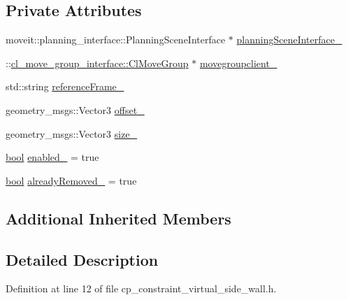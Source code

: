 \subsection*{Private Attributes}
\begin{DoxyCompactItemize}
\item 
moveit\+::planning\+\_\+interface\+::\+Planning\+Scene\+Interface $\ast$ \hyperlink{classsm__fetch__screw__loop__1_1_1cl__move__group__interface_1_1CpConstraintVirtualSideWall_a36d055e567438938c2355ad5ee081498}{planning\+Scene\+Interface\+\_\+}
\item 
\+::\hyperlink{classcl__move__group__interface_1_1ClMoveGroup}{cl\+\_\+move\+\_\+group\+\_\+interface\+::\+Cl\+Move\+Group} $\ast$ \hyperlink{classsm__fetch__screw__loop__1_1_1cl__move__group__interface_1_1CpConstraintVirtualSideWall_a6832fffc147a8a3f9206a7d76546f6b7}{movegroupclient\+\_\+}
\item 
std\+::string \hyperlink{classsm__fetch__screw__loop__1_1_1cl__move__group__interface_1_1CpConstraintVirtualSideWall_af0f1ec5b78685c0c4a45906aca85219e}{reference\+Frame\+\_\+}
\item 
geometry\+\_\+msgs\+::\+Vector3 \hyperlink{classsm__fetch__screw__loop__1_1_1cl__move__group__interface_1_1CpConstraintVirtualSideWall_a2bb600f30ac245821b733051f67ff1f5}{offset\+\_\+}
\item 
geometry\+\_\+msgs\+::\+Vector3 \hyperlink{classsm__fetch__screw__loop__1_1_1cl__move__group__interface_1_1CpConstraintVirtualSideWall_ab495461dac422e249302ec9be8e9e17a}{size\+\_\+}
\item 
\hyperlink{classbool}{bool} \hyperlink{classsm__fetch__screw__loop__1_1_1cl__move__group__interface_1_1CpConstraintVirtualSideWall_a9d17ffd44fe6739ea5e5e4113d470a60}{enabled\+\_\+} = true
\item 
\hyperlink{classbool}{bool} \hyperlink{classsm__fetch__screw__loop__1_1_1cl__move__group__interface_1_1CpConstraintVirtualSideWall_aabc81a5e528f1e9c72e2ee12c4a9740f}{already\+Removed\+\_\+} = true
\end{DoxyCompactItemize}
\subsection*{Additional Inherited Members}


\subsection{Detailed Description}


Definition at line 12 of file cp\+\_\+constraint\+\_\+virtual\+\_\+side\+\_\+wall.\+h.



